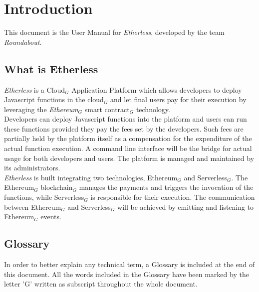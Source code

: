 \section{Introduction}
This document is the User Manual for \textit{Etherless}, developed by the team \textit{Roundabout}.
\subsection{What is Etherless}
\textit{Etherless} is a Cloud$_{G}$ Application Platform which allows developers to deploy Javascript functions in the cloud$_{G}$ and let final users pay for their execution by leveraging the \textit{Ethereum$_{G}$} smart contract$_{G}$ technology.\\
Developers can deploy Javascript functions into the platform and users can run these functions provided they pay the fees set by the developers. Such fees are partially held by the platform itself as a compensation for the expenditure of the actual function execution. A command line interface will be the bridge for actual usage for both developers and users. The platform is managed and maintained by its administrators.\\
\textit{Etherless} is built integrating two technologies, Ethereum$_{G}$ and Serverless$_{G}$. The Ethereum$_{G}$ blockchain$_{G}$ manages the payments and triggers the invocation of the functions, while Serverless$_{G}$ is responsible for their execution. The communication between Ethereum$_{G}$ and Serverless$_{G}$ will be achieved by emitting and listening to Ethereum$_{G}$ events.

\subsection{Glossary}
In order to better explain any technical term, a Glossary is included at the end of this document. All the words included in the Glossary have been marked by the letter 'G' written as subscript throughout the whole document.